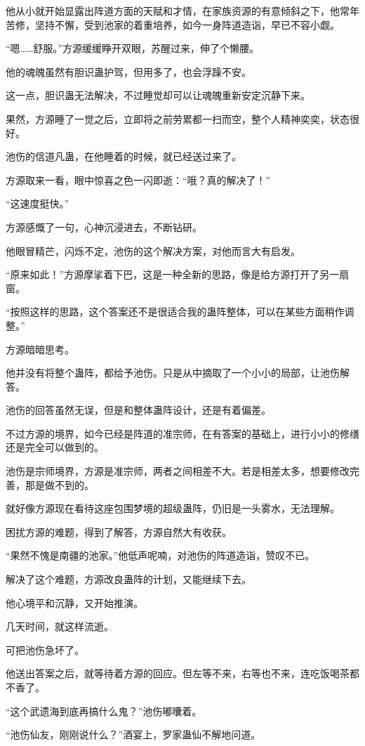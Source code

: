 \begin{this_body}
他从小就开始显露出阵道方面的天赋和才情，在家族资源的有意倾斜之下，他常年苦修，坚持不懈，受到池家的着重培养，如今一身阵道造诣，早已不容小觑。

“嗯……舒服。”方源缓缓睁开双眼，苏醒过来，伸了个懒腰。

他的魂魄虽然有胆识蛊护驾，但用多了，也会浮躁不安。

这一点，胆识蛊无法解决，不过睡觉却可以让魂魄重新安定沉静下来。

果然，方源睡了一觉之后，立即将之前劳累都一扫而空，整个人精神奕奕，状态很好。

池伤的信道凡蛊，在他睡着的时候，就已经送过来了。

方源取来一看，眼中惊喜之色一闪即逝：“哦？真的解决了！”

“这速度挺快。”

方源感慨了一句，心神沉浸进去，不断钻研。

他眼冒精芒，闪烁不定，池伤的这个解决方案，对他而言大有启发。

“原来如此！”方源摩挲着下巴，这是一种全新的思路，像是给方源打开了另一扇窗。

“按照这样的思路，这个答案还不是很适合我的蛊阵整体，可以在某些方面稍作调整。”

方源暗暗思考。

他并没有将整个蛊阵，都给予池伤。只是从中摘取了一个小小的局部，让池伤解答。

池伤的回答虽然无误，但是和整体蛊阵设计，还是有着偏差。

不过方源的境界，如今已经是阵道的准宗师，在有答案的基础上，进行小小的修缮还是完全可以做到的。

池伤是宗师境界，方源是准宗师，两者之间相差不大。若是相差太多，想要修改完善，那是做不到的。

就好像方源现在看待这座包围梦境的超级蛊阵，仍旧是一头雾水，无法理解。

困扰方源的难题，得到了解答，方源自然大有收获。

“果然不愧是南疆的池家。”他低声呢喃，对池伤的阵道造诣，赞叹不已。

解决了这个难题，方源改良蛊阵的计划，又能继续下去。

他心境平和沉静，又开始推演。

几天时间，就这样流逝。

可把池伤急坏了。

他送出答案之后，就等待着方源的回应。但左等不来，右等也不来，连吃饭喝茶都不香了。

“这个武遗海到底再搞什么鬼？”池伤嘟囔着。

“池伤仙友，刚刚说什么？”酒宴上，罗家蛊仙不解地问道。


\end{this_body}
